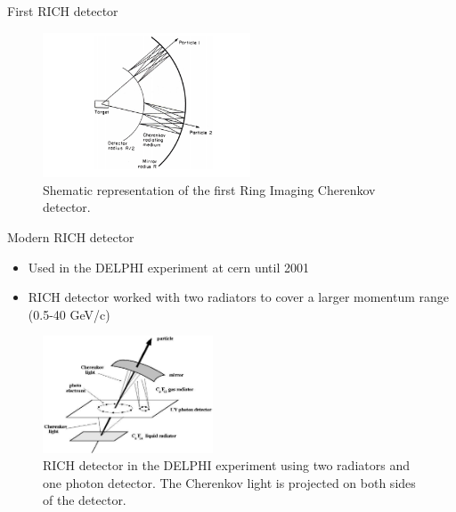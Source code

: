 \documentclass[aspectratio=1610, 10pt]{beamer}
\begin{document}
\begin{frame}{First RICH detector}
  \begin{figure}
    \includegraphics[width=0.55\textwidth]{images/rich.png}
    \caption{Shematic representation of the first Ring Imaging Cherenkov detector.}
  \end{figure}
\end{frame}

\begin{frame}{Modern RICH detector}
  \begin{itemize}
    \item Used in the DELPHI experiment at cern until 2001
    \medskip
    \item RICH detector worked with two radiators to cover a larger momentum range (0.5-40 GeV/c)
  \end{itemize}
  \begin{figure}
    \includegraphics[width=0.45\textwidth]{images/rich_delphi.png}
    \caption{RICH detector in the DELPHI experiment using two radiators and one photon detector. The Cherenkov light is projected on both
    sides of the detector.}
  \end{figure}
\end{frame}
\end{document}
